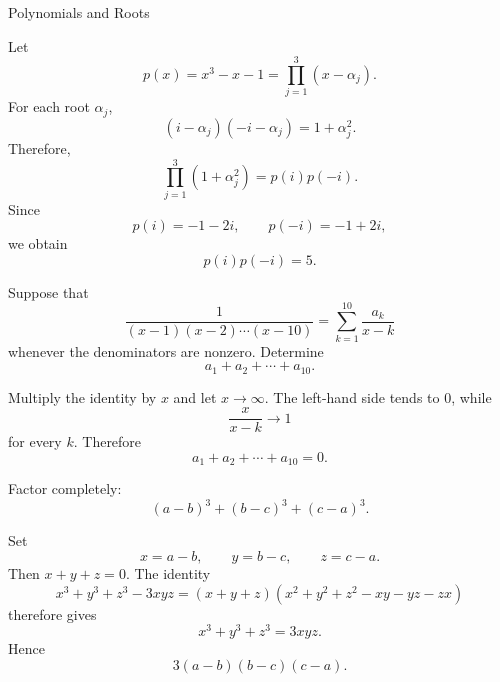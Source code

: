 \begin{expectedproblemgroup}{Polynomials and Roots}
        \begin{expectedsubsolution}
            Let
            \[
                p(x)=x^3-x-1
                =
                \prod_{j=1}^{3}(x-\alpha_j).
            \]
            For each root $\alpha_j$,
            \[
                (i-\alpha_j)(-i-\alpha_j)=1+\alpha_j^2.
            \]
            Therefore,
            \[
                \prod_{j=1}^{3}(1+\alpha_j^2)
                =
                p(i)p(-i).
            \]
            Since
            \[
                p(i)=-1-2i,
                \qquad
                p(-i)=-1+2i,
            \]
            we obtain
            \[
                \boxed{p(i)p(-i)=5}.
            \]
        \end{expectedsubsolution}

        \begin{expectedsubproblem}[1995 CSAT]
            Suppose that
            \[
                \frac{1}{(x-1)(x-2)\cdots(x-10)}
                =
                \sum_{k=1}^{10}\frac{a_k}{x-k}
            \]
            whenever the denominators are nonzero. Determine
            \[
                a_1+a_2+\cdots+a_{10}.
            \]
        \end{expectedsubproblem}

        \begin{expectedsubsolution}
            Multiply the identity by $x$ and let $x\to\infty$. The left-hand side
            tends to $0$, while
            \[
                \frac{x}{x-k}\to1
            \]
            for every $k$. Therefore
            \[
                \boxed{a_1+a_2+\cdots+a_{10}=0}.
            \]
        \end{expectedsubsolution}

        \begin{expectedsubproblem}
            Factor completely:
            \[
                (a-b)^3+(b-c)^3+(c-a)^3.
            \]
        \end{expectedsubproblem}

        \begin{expectedsubsolution}
            Set
            \[
                x=a-b,
                \qquad
                y=b-c,
                \qquad
                z=c-a.
            \]
            Then $x+y+z=0$. The identity
            \[
                x^3+y^3+z^3-3xyz
                =
                (x+y+z)
                (x^2+y^2+z^2-xy-yz-zx)
            \]
            therefore gives
            \[
                x^3+y^3+z^3=3xyz.
            \]
            Hence
            \[
                \boxed{3(a-b)(b-c)(c-a)}.
            \]
        \end{expectedsubsolution}

    \end{expectedproblemgroup}

